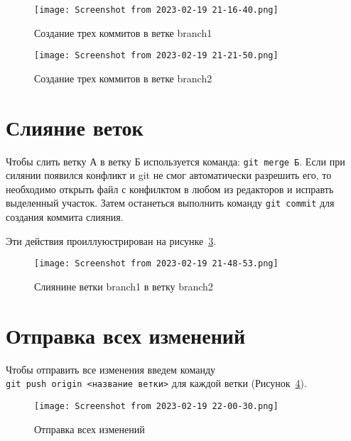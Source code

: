 \begin{figure}[h!tp]
	\centering
	\texttt{[image: Screenshot from 2023-02-19 21-16-40.png]}
	\caption{Создание трех коммитов в ветке branch1}
	\label{3:fig:git:branch:1:commits}
\end{figure}
\begin{figure}[h!tp]
	\centering
	\texttt{[image: Screenshot from 2023-02-19 21-21-50.png]}
	\caption{Создание трех коммитов в ветке branch2}
	\label{3:fig:git:branch:2:commits}
\end{figure}

\section{Слияние веток}
Чтобы слить ветку А в ветку Б используется команда: \texttt{git merge Б}.
Если при силянии появился конфликт и git не смог автоматически разрешить его,
то необходимо открыть файл с конфилктом в любом из редакторов и исправть
выделенный участок. Затем останеться выполнить команду \texttt{git commit}
для создания коммита слияния. 

Эти действия проиллуюстрирован на рисунке~\ref{3:fig:git:merge}.

\begin{figure}[h!tp]
	\centering
	\texttt{[image: Screenshot from 2023-02-19 21-48-53.png]}
	\caption{Слиянине ветки branch1 в ветку branch2}
	\label{3:fig:git:merge}
\end{figure}

\section{Отправка всех изменений}
Чтобы отправить все изменения введем команду
\texttt{git~push~origin~<название~ветки>} для каждой ветки
(Рисунок~\ref{3:fig:git:push:all}).

\begin{figure}[h!tp]
	\centering
	\texttt{[image: Screenshot from 2023-02-19 22-00-30.png]}
	\caption{Отправка всех изменений}
	\label{3:fig:git:push:all}
\end{figure}

